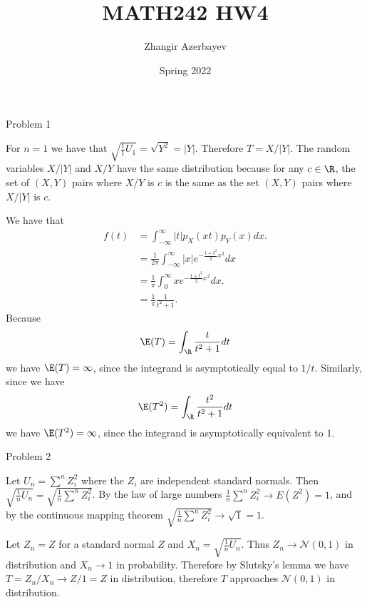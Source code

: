 \documentclass{article}
\title{MATH242 HW4}
\author{Zhangir Azerbayev}
\date{Spring 2022}
\begin{document}
\maketitle

\begin{question}{Problem 1}

    \begin{part}
        For $n=1$ we have that $\sqrt{\frac{1}{1}U_1} = \sqrt{Y^2} = |Y|$. Therefore $T=X/|Y|$. The random variables $X/|Y|$ and $X/Y$ have the same distribution because for any $c\in\R$, the set of $(X, Y)$ pairs where $X/Y$ is $c$ is the same as the set $(X, Y)$ pairs where $X/|Y|$ is $c$. 
    \end{part}
    \begin{part}
        We have that 
        \begin{align*}
            f(t) &= \int_{-\infty}^\infty|t|p_X(xt)p_Y(x)dx.\\
                 &= \frac{1}{2\pi}\int_{-\infty}^\infty |x| e^{-\frac{1+t^2}{2}x^2}dx\\
                 &= \frac{1}{\pi}\int_0^\infty xe^{-\frac{1+t^2}{2}x^2}dx.\\
                 &= \frac{1}{\pi}\frac{1}{t^2+1}. 
        \end{align*}
        Because 
        \[\E(T) = \int_\R \frac{t}{t^2+1}dt\]
        we have $\E(T)=\infty$, since the integrand is asymptotically equal to $1/t$. Similarly, since we have 
        \[\E(T^2) = \int_\R \frac{t^2}{t^2+1}dt\]
        we have $\E(T^2) = \infty$, since the integrand is asymptotically equivalent to $1$. 
    \end{part}
\end{question}
\begin{question}{Problem 2}
    \begin{part}
        Let $U_n = \sum^n Z_i^2$ where the $Z_i$ are independent standard normals. Then $\sqrt{\frac{1}{n}U_n} = \sqrt{\frac{1}{n}\sum^nZ_i^2}$. By the law of large numbers $\frac{1}{n}\sum^nZ_i^2 \to E(Z^2)=1$, and by the continuous mapping theorem $\sqrt{\frac{1}{n}\sum^nZ_i^2} \to \sqrt{1} = 1$. 
    \end{part}
    \begin{part}
        Let $Z_n=Z$ for a standard normal $Z$ and $X_n = \sqrt{\frac{1}{n}U_n}$. Thus $Z_n \to \mathcal{N}(0, 1)$ in distribution and $X_n \to 1$ in probability. Therefore by Slutsky's lemma we have $T = Z_n/X_n \to Z/1 = Z$ in distribution, therefore $T$ approaches $\mathcal{N}(0, 1)$ in distribution. 
    \end{part}
\end{question}
\end{document}
